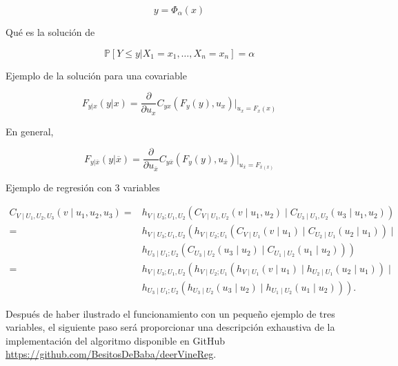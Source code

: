 \begin{equation}\label{regresion}
    y = \Phi_{\alpha}(x)
\end{equation}

Qué es la solución de 

\begin{equation}
     \mathbb{P}[Y \leq y | X_1 = x_1, \dots, X_n = x_n ] = \alpha
\end{equation}

Ejemplo de la solución para una covariable

\begin{equation}
    F_{y|x}(y|x) = \frac{\partial }{\partial u_x} C_{yx}(F_y(y), u_x) \Big|_{u_x = F_x(x)}  
\end{equation}

En general, 

\begin{equation}
    F_{y|\overline{x}}(y|\overline{x}) = \frac{\partial }{\partial u_{\overline{x}}} C_{y\overline{x}}(F_y(y), u_{\overline{x}}) \Big|_{u_{\overline{x}} =F_{\overline{x}(x)}} 
\end{equation}

Ejemplo de regresión con 3 variables 

\begin{equation}
    \begin{aligned}
    C_{V \mid U_1, U_2, U_3}\left(v \mid u_1, u_2, u_3\right) 
    = & h_{V \mid U_3 ; U_1, U_2}\left(C_{V \mid U_1, U_2}\left(v \mid u_1, u_2\right) \mid C_{U_3 \mid U_1, U_2}\left(u_3 \mid u_1, u_2\right)\right) \\
    = & h_{V \mid U_3 ; U_1, U_2}\left(h_{V \mid U_2 ; U_1}\left(C_{V \mid U_1}\left(v \mid u_1\right) \mid C_{U_2 \mid U_1}\left(u_2 \mid u_1\right)\right) \mid\right. \\
    & \left.h_{U_3 \mid U_1 ; U_2}\left(C_{U_3 \mid U_2}\left(u_3 \mid u_2\right) \mid C_{U_1 \mid U_2}\left(u_1 \mid u_2\right)\right)\right) \\ 
    = & h_{V \mid U_3 ; U_1, U_2}\left(h_{V \mid U_2 ; U_1}\left(h_{V \mid U_1}\left(v \mid u_1\right) \mid h_{U_2 \mid U_1}\left(u_2 \mid u_1\right)\right) \mid\right. \\
    & \left.h_{U_3 \mid U_1 ; U_2}\left(h_{U_3 \mid U_2}\left(u_3 \mid u_2\right) \mid h_{U_1 \mid U_2}\left(u_1 \mid u_2\right)\right)\right).
    \end{aligned}
\end{equation}


Después de haber ilustrado el funcionamiento con un pequeño ejemplo de tres variables, el siguiente paso será proporcionar una descripción exhaustiva de la implementación del algoritmo disponible en GitHub \url{https://github.com/BesitosDeBaba/deerVineReg}.

